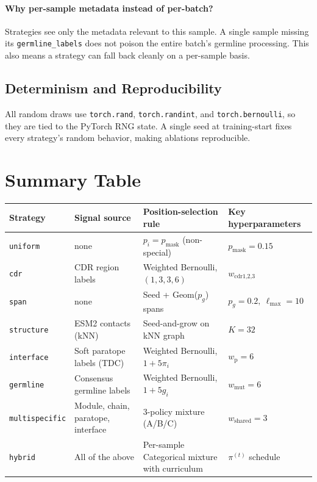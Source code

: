 \documentclass[11pt]{article}
\newcommand{\pmask}{p_{\text{mask}}}
\begin{document}
\paragraph{Why per-sample metadata instead of per-batch?}
Strategies see only the metadata relevant to this sample. A single
sample missing its \texttt{germline\_labels} does not poison the
entire batch's germline processing. This also means a strategy can
fall back cleanly on a per-sample basis.

\subsection{Determinism and Reproducibility}
All random draws use \texttt{torch.rand}, \texttt{torch.randint}, and
\texttt{torch.bernoulli}, so they are tied to the PyTorch RNG state.
A single seed at training-start fixes every strategy's random
behavior, making ablations reproducible.

\section{Summary Table}

\begin{center}
\renewcommand{\arraystretch}{1.3}
\small
{}
\begin{tabularx}{\textwidth}{@{}l L L L@{}}
\toprule
Strategy & Signal source & Position-selection rule & Key hyperparameters \\
\midrule
\texttt{uniform} & none & $p_i = \pmask$ (non-special) & $\pmask = 0.15$ \\
\texttt{cdr} & CDR region labels & Weighted Bernoulli, $(1,3,3,6)$ & $w_{\text{cdr1,2,3}}$ \\
\texttt{span} & none & Seed + Geom($p_g$) spans & $p_g = 0.2,\ \ell_{\max} = 10$ \\
\texttt{structure} & ESM2 contacts (kNN) & Seed-and-grow on kNN graph & $K = 32$ \\
\texttt{interface} & Soft paratope labels (TDC) & Weighted Bernoulli, $1 + 5\pi_i$ & $w_{\text{p}} = 6$ \\
\texttt{germline} & Consensus germline labels & Weighted Bernoulli, $1 + 5 g_i$ & $w_{\text{mut}} = 6$ \\
\texttt{multispecific} & Module, chain, paratope, interface & 3-policy mixture (A/B/C) & $w_{\text{shared}} = 3$ \\
\texttt{hybrid} & All of the above & Per-sample Categorical mixture with curriculum & $\pi^{(t)}$ schedule \\
\bottomrule
\end{tabularx}
\end{center}
\end{document}
